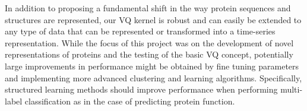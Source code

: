 In addition to proposing a fundamental shift in the way protein sequences and structures are represented, our VQ kernel is robust and can easily be extended to any type of data that can be represented or transformed into a time-series representation.  While the focus of this project was on the development of novel representations of proteins and the testing of the basic VQ concept, potentially large improvements in performance might be obtained by fine tuning parameters and implementing more advanced clustering and learning algorithms.  Specifically, structured learning methods should improve performance when performing multi-label classification as in the case of predicting protein function.








